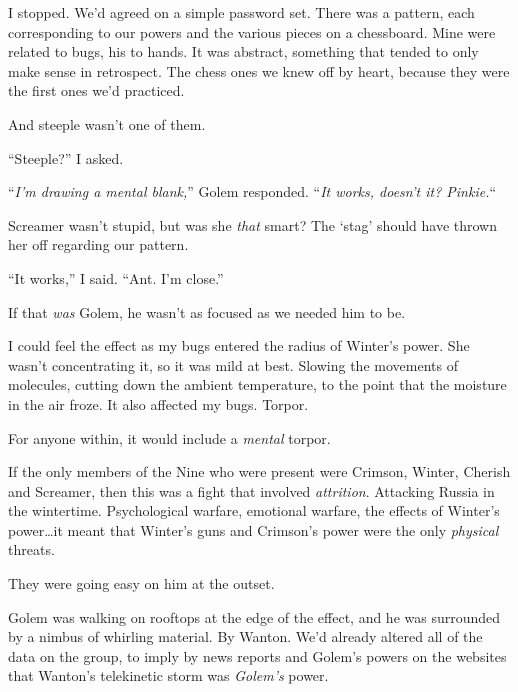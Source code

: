 I stopped.  We'd agreed on a simple password set.  There was a pattern, each corresponding to our powers and the various pieces on a chessboard.  Mine were related to bugs, his to hands.  It was abstract, something that tended to only make sense in retrospect.  The chess ones we knew off by heart, because they were the first ones we'd practiced.



And steeple wasn't one of them.



``Steeple?'' I asked.



``\emph{I'm drawing a mental blank,}'' Golem responded.  ``\emph{It works, doesn't it?  Pinkie.}``



Screamer wasn't stupid, but was she \emph{that} smart?  The `stag' should have thrown her off regarding our pattern.



``It works,'' I said.  ``Ant.\emph{  }I'm close.''



If that \emph{was} Golem, he wasn't as focused as we needed him to be.



I could feel the effect as my bugs entered the radius of Winter's power.  She wasn't concentrating it, so it was mild at best.  Slowing the movements of molecules, cutting down the ambient temperature, to the point that the moisture in the air froze.  It also affected my bugs.  Torpor.



For anyone within, it would include a \emph{mental} torpor.



If the only members of the Nine who were present were Crimson, Winter, Cherish and Screamer, then this was a fight that involved \emph{attrition}.  Attacking Russia in the wintertime.  Psychological warfare, emotional warfare, the effects of Winter's power\ldots it meant that Winter's guns and Crimson's power were the only \emph{physical }threats.



They were going easy on him at the outset.



Golem was walking on rooftops at the edge of the effect, and he was surrounded by a nimbus of whirling material.  By Wanton.  We'd already altered all of the data on the group, to imply by news reports and Golem's powers on the websites that Wanton's telekinetic storm was \emph{Golem's} power.



